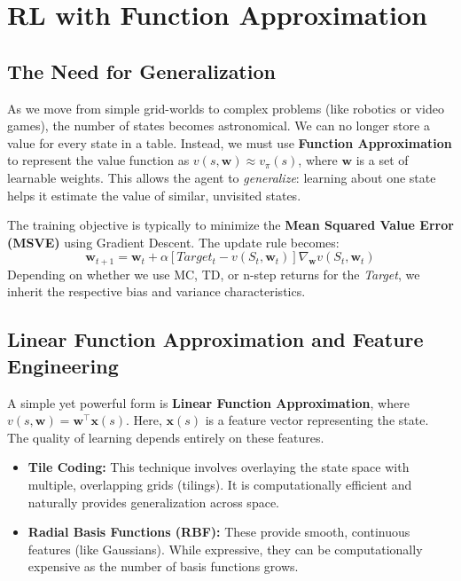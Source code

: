 \section{RL with Function Approximation}

\subsection{The Need for Generalization}
As we move from simple grid-worlds to complex problems (like robotics or video games), the number of states becomes astronomical. We can no longer store a value for every state in a table. Instead, we must use \textbf{Function Approximation} to represent the value function as $v(s, \mathbf{w}) \approx v_\pi(s)$, where $\mathbf{w}$ is a set of learnable weights. This allows the agent to \textit{generalize}: learning about one state helps it estimate the value of similar, unvisited states.

The training objective is typically to minimize the \textbf{Mean Squared Value Error (MSVE)} using Gradient Descent. The update rule becomes:
\[ \mathbf{w}_{t+1} = \mathbf{w}_t + \alpha [Target_t - v(S_t, \mathbf{w}_t)] \nabla_{\mathbf{w}} v(S_t, \mathbf{w}_t) \]
Depending on whether we use MC, TD, or n-step returns for the \textit{Target}, we inherit the respective bias and variance characteristics.

\subsection{Linear Function Approximation and Feature Engineering}
A simple yet powerful form is \textbf{Linear Function Approximation}, where $v(s, \mathbf{w}) = \mathbf{w}^\top \mathbf{x}(s)$. Here, $\mathbf{x}(s)$ is a feature vector representing the state. The quality of learning depends entirely on these features.
\begin{itemize}
    \item \textbf{Tile Coding:} This technique involves overlaying the state space with multiple, overlapping grids (tilings). It is computationally efficient and naturally provides generalization across space.
    \item \textbf{Radial Basis Functions (RBF):} These provide smooth, continuous features (like Gaussians). While expressive, they can be computationally expensive as the number of basis functions grows.
\end{itemize}

